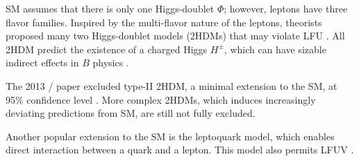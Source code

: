 SM assumes that there is only one Higgs-doublet $\Phi$; however, leptons have
three flavor families.
Inspired by the multi-flavor nature of the leptons, theorists proposed many two
Higgs-doublet models (2HDMs) that may violate LFU \cite{Branco:2011iw}.
All 2HDM predict the existence of a charged Higgs $H^{\pm}$, which can have
sizable indirect effects in $B$ physics \cite{Branco:2011iw}.

The 2013 \BaBar/ paper excluded type-II 2HDM, a minimal extension to the SM, at
95\% confidence level \cite{Lees:2013uzd}.
More complex 2HDMs, which induces increasingly deviating predictions from SM, are
still not fully excluded.

Another popular extension to the SM is the leptoquark model, which enables
direct interaction between a quark and a lepton.
This model also permits LFUV \cite{Faber:2018afz}.
